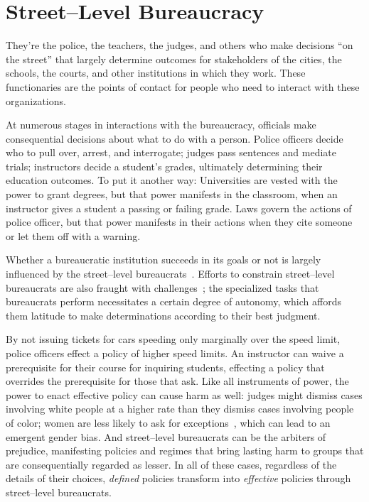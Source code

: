 \documentclass[main]{subfiles}
\begin{document}
\section{Street--Level Bureaucracy}\label{sec:bureau}

They're the police, the teachers, the judges, and others who make decisions ``on the street''
that largely determine outcomes for stakeholders of
the cities, the schools, the courts, and other institutions in which they work.
These functionaries are the points of contact for people who need to interact with these organizations.

At numerous stages in interactions with the bureaucracy,
officials make consequential decisions about what to do with a person.
Police officers decide who to pull over, arrest, and interrogate;
judges pass sentences and mediate trials;
instructors decide a student's grades, ultimately determining their education outcomes.
To put it another way:
Universities are vested with the power to grant degrees, but
that power manifests in the classroom, when an instructor gives a student a passing or failing grade.
Laws govern the actions of police officer, but
that power manifests in their actions when they cite someone or let them off with a warning.

Whether a bureaucratic institution succeeds in its goals or not is
largely influenced by the street--level bureaucrats~\cite{wilson1989bureaucracy,hanf1982implementation}.
Efforts to constrain street--level bureaucrats are also fraught with challenges~\cite{huber2002deliberate};
the specialized tasks that bureaucrats perform necessitates a certain degree of autonomy, which
affords them latitude to make determinations according to their best judgment.

By not issuing tickets for cars speeding only marginally over the speed limit,
police officers effect a policy of higher speed limits.
An instructor can waive a prerequisite for their course for inquiring students,
effecting a policy that overrides the prerequisite for those that ask.
Like all instruments of power, the power to enact effective policy can cause harm as well:
judges might dismiss cases involving white people at a higher rate than they dismiss cases involving people of color;
women are less likely to ask for exceptions~\cite{babcock2009women},
which can lead to an emergent gender bias.
And street--level bureaucrats can be the arbiters of prejudice,
manifesting policies and regimes that bring lasting harm to groups that are consequentially regarded as lesser.
In all of these cases, regardless of the details of their choices,
\textit{defined} policies transform into \textit{effective} policies
through street--level bureaucrats.
\end{document}
